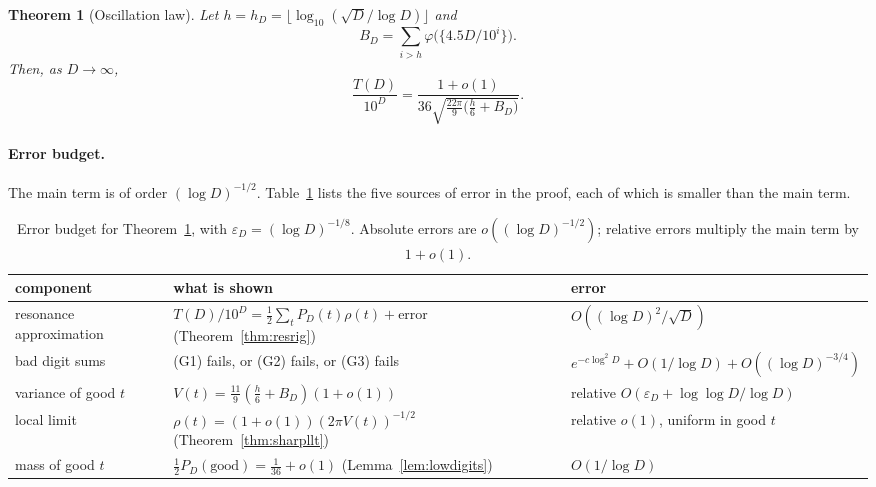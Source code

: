 \documentclass[11pt]{article}
\newtheorem{theorem}{Theorem}[section]
\theoremstyle{definition}
\theoremstyle{remark}
\begin{document}
\begin{theorem}[Oscillation law]\label{thm:osclaw}
Let $h=h_D=\lfloor\log_{10}(\sqrt D/\log D)\rfloor$ and
\[
  B_D=\sum_{i>h}\varphi\bigl(\{4.5D/10^i\}\bigr).
\]
Then, as $D\to\infty$,
\[
  \frac{T(D)}{10^D}=\frac{1+o(1)}{36\sqrt{\frac{22\pi}9\bigl(\frac h6+B_D\bigr)}} .
\]
\end{theorem}

\paragraph{Error budget.} The main term is of order $(\log D)^{-1/2}$.
Table~\ref{tab:budget} lists the five sources of error in the proof, each of
which is smaller than the main term.

\begin{table}[h]
\centering
\small
\begin{tabular}{>{\raggedright}p{3.1cm}>{\raggedright}p{5.6cm}>{\raggedright\arraybackslash}p{4cm}}
\toprule
component & what is shown & error\\
\midrule
resonance approximation & $T(D)/10^D=\frac12\sum_tP_D(t)\rho(t)+\text{error}$ (Theorem~\ref{thm:resrig}) & $O((\log D)^2/\sqrt D)$\\
bad digit sums & (G1) fails, or (G2) fails, or (G3) fails & $e^{-c\log^2D}+O(1/\log D)+O((\log D)^{-3/4})$\\
variance of good $t$ & $V(t)=\frac{11}9(\frac h6+B_D)(1+o(1))$ & relative $O(\varepsilon_D+\log\log D/\log D)$\\
local limit & $\rho(t)=(1+o(1))(2\pi V(t))^{-1/2}$ (Theorem~\ref{thm:sharpllt}) & relative $o(1)$, uniform in good $t$\\
mass of good $t$ & $\frac12P_D(\text{good})=\frac1{36}+o(1)$ (Lemma~\ref{lem:lowdigits}) & $O(1/\log D)$\\
\bottomrule
\end{tabular}
\caption{Error budget for Theorem~\ref{thm:osclaw}, with
$\varepsilon_D=(\log D)^{-1/8}$. Absolute errors are $o((\log D)^{-1/2})$;
relative errors multiply the main term by $1+o(1)$.}\label{tab:budget}
\end{table}
\end{document}
